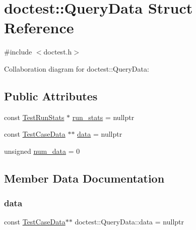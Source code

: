\hypertarget{structdoctest_1_1QueryData}{}\section{doctest\+:\+:Query\+Data Struct Reference}
\label{structdoctest_1_1QueryData}


{\ttfamily \#include $<$doctest.\+h$>$}



Collaboration diagram for doctest\+:\+:Query\+Data\+:
\subsection*{Public Attributes}
\begin{DoxyCompactItemize}
\item 
const \hyperlink{structdoctest_1_1TestRunStats}{Test\+Run\+Stats} $\ast$ \hyperlink{structdoctest_1_1QueryData_a435f443f389323f47cb8b0e4202bbea9}{run\+\_\+stats} = nullptr
\item 
const \hyperlink{structdoctest_1_1TestCaseData}{Test\+Case\+Data} $\ast$$\ast$ \hyperlink{structdoctest_1_1QueryData_a8085a29db9a1cd5c7eff22ef44e9a9e8}{data} = nullptr
\item 
unsigned \hyperlink{structdoctest_1_1QueryData_af1033338fe975ae3c19b16452401230d}{num\+\_\+data} = 0
\end{DoxyCompactItemize}


\subsection{Member Data Documentation}
\mbox{\label{structdoctest_1_1QueryData_a8085a29db9a1cd5c7eff22ef44e9a9e8}} 
\subsubsection{\texorpdfstring{data}{data}}
{\footnotesize\ttfamily const \hyperlink{structdoctest_1_1TestCaseData}{Test\+Case\+Data}$\ast$$\ast$ doctest\+::\+Query\+Data\+::data = nullptr}

\mbox{\label{structdoctest_1_1QueryData_af1033338fe975ae3c19b16452401230d}} 
